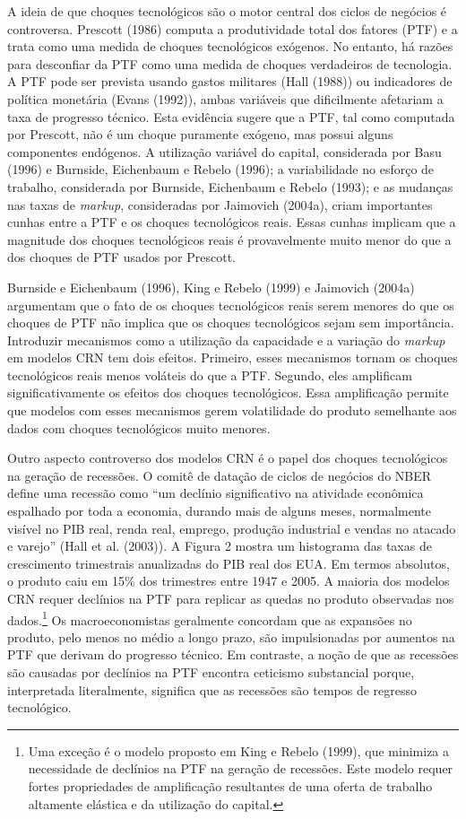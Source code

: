 \documentclass[12pt]{article}
\begin{document}
A ideia de que choques tecnológicos são o motor central dos ciclos de negócios é controversa. Prescott (1986) computa a produtividade total dos fatores (PTF) e a trata como uma medida de choques tecnológicos exógenos. No entanto, há razões para desconfiar da PTF como uma medida de choques verdadeiros de tecnologia. A PTF pode ser prevista usando gastos militares (Hall (1988)) ou indicadores de política monetária (Evans (1992)), ambas variáveis que dificilmente afetariam a taxa de progresso técnico. Esta evidência sugere que a PTF, tal como computada por Prescott, não é um choque puramente exógeno, mas possui alguns componentes endógenos. A utilização variável do capital, considerada por Basu (1996) e Burnside, Eichenbaum e Rebelo (1996); a variabilidade no esforço de trabalho, considerada por Burnside, Eichenbaum e Rebelo (1993); e as mudanças nas taxas de \textit{markup}, consideradas por Jaimovich (2004a), criam importantes cunhas entre a PTF e os choques tecnológicos reais. Essas cunhas implicam que a magnitude dos choques tecnológicos reais é provavelmente muito menor do que a dos choques de PTF usados por Prescott.

Burnside e Eichenbaum (1996), King e Rebelo (1999) e Jaimovich (2004a) argumentam que o fato de os choques tecnológicos reais serem menores do que os choques de PTF não implica que os choques tecnológicos sejam sem importância. Introduzir mecanismos como a utilização da capacidade e a variação do \textit{markup} em modelos CRN tem dois efeitos. Primeiro, esses mecanismos tornam os choques tecnológicos reais menos voláteis do que a PTF. Segundo, eles amplificam significativamente os efeitos dos choques tecnológicos. Essa amplificação permite que modelos com esses mecanismos gerem volatilidade do produto semelhante aos dados com choques tecnológicos muito menores.

Outro aspecto controverso dos modelos CRN é o papel dos choques tecnológicos na geração de recessões. O comitê de datação de ciclos de negócios do NBER define uma recessão como “um declínio significativo na atividade econômica espalhado por toda a economia, durando mais de alguns meses, normalmente visível no PIB real, renda real, emprego, produção industrial e vendas no atacado e varejo” (Hall et al. (2003)). A Figura 2 mostra um histograma das taxas de crescimento trimestrais anualizadas do PIB real dos EUA. Em termos absolutos, o produto caiu em 15\% dos trimestres entre 1947 e 2005. A maioria dos modelos CRN requer declínios na PTF para replicar as quedas no produto observadas nos dados.\footnote{Uma exceção é o modelo proposto em King e Rebelo (1999), que minimiza a necessidade de declínios na PTF na geração de recessões. Este modelo requer fortes propriedades de amplificação resultantes de uma oferta de trabalho altamente elástica e da utilização do capital.} Os macroeconomistas geralmente concordam que as expansões no produto, pelo menos no médio a longo prazo, são impulsionadas por aumentos na PTF que derivam do progresso técnico. Em contraste, a noção de que as recessões são causadas por declínios na PTF encontra ceticismo substancial porque, interpretada literalmente, significa que as recessões são tempos de regresso tecnológico.
\end{document}
